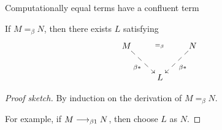 \begin{frame}{Computationally equal terms have a confluent term}

  \begin{corollary}\label{coro:computational-meanting-confluence}
    If $M =_\beta N$, then there exists $L$ satisfying
  \[
    \xymatrix{
      M \ar@{-->}[rd]_{\beta*} \ar@{}[rr]|{=_\beta} & & N \ar@{-->}[ld]^{\beta*} \\
      & L
    }
  \]
  \end{corollary}
  \begin{proof}[Proof sketch]
    By induction on the derivation of $M =_\beta N$. 

    For example, if $M \longrightarrow_{\beta1} N$, then choose $L$ as $N$. 
  \end{proof}

\end{frame}

